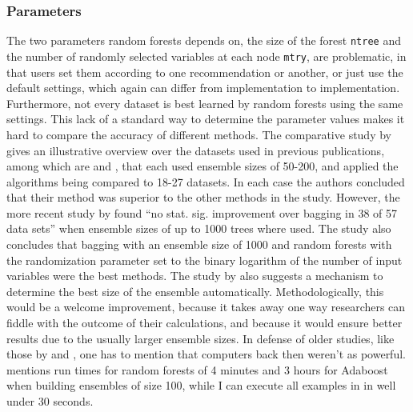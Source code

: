 \documentclass[a4paper,man,12pt,apacite,floatsintext,draftfirst]{apa6} %
\begin{document}
\subsubsection{Parameters}
The two parameters random forests depends on, the size of the forest
\texttt{ntree} and the number of randomly selected variables at each node
\texttt{mtry}, are problematic,
in that users set them according to one recommendation or another,
or just use the default settings, which again can differ from implementation
to implementation.
Furthermore, not every dataset is best learned by random forests using the
same settings.
This lack of a standard way to determine the parameter values makes it hard
to compare the accuracy of different methods.
The comparative study by \cite{banfield2007comparison} gives an
illustrative overview over the datasets used in previous publications,
among which are \cite{breiman2001random} and \cite{dietterich2000ensemble},
that each used ensemble sizes of 50-200, and applied the algorithms being
compared to 18-27 datasets.
In each case the authors concluded that their method was superior to the
other methods in the study.
However, the more recent study by \cite{banfield2007comparison} found
“no stat. sig. improvement over bagging in 38 of 57 data sets”
when ensemble sizes of up to 1000 trees where used.
The study also concludes that bagging with an ensemble size of 1000 and
random forests with the randomization parameter set to the
binary logarithm of the number of input variables were the best methods.
The study by \cite{banfield2007comparison} also suggests a mechanism
to determine the best size of the ensemble automatically.
Methodologically, this would be a welcome improvement, because it takes
away one way researchers can fiddle with the outcome of their calculations,
and because it would ensure better results due to the usually larger
ensemble sizes.
In defense of older studies, like those by \cite{breiman2001random} and
\cite{dietterich2000ensemble}, one has to mention that
computers back then weren't as powerful.
\cite{breiman2001random} mentions run times for random forests of 4 minutes
and 3 hours for Adaboost when building ensembles of size 100,
while I can execute all examples in \cite{strobl2009introduction}
in well under 30 seconds.
\end{document}
